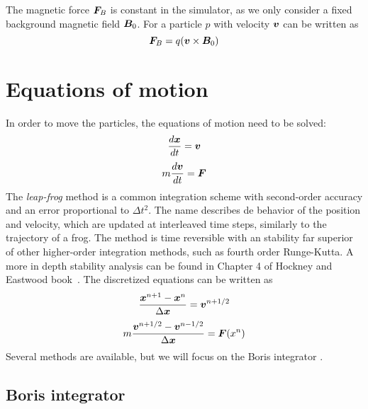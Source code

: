 The magnetic force $\bm{F}_B$ is constant in the simulator, as we only consider a 
fixed background magnetic field $\bm{B}_0$. For a particle $p$ with velocity $\bm{v}$  
can be written as
%
\begin{equation}%
\F_B = q (\v \times \B_0)
\end{equation}%


\section{Equations of motion}
\label{sec:motion}

In order to move the particles, the equations of motion need to be solved:
%
\begin{equation}
\frac{d\bm{x}}{dt}=\bm{v}
\end{equation}
\begin{equation}
m \frac{d\bm{v}}{dt} = \bm{F}
\end{equation}
%
The \textit{leap-frog} method is a common integration scheme with second-order 
accuracy and an error proportional to $\Delta t^2$. The name describes de 
behavior of the position and velocity, which are updated at interleaved time 
steps, similarly to the trajectory of a frog. The method is time reversible with 
an stability far superior of other higher-order integration methods, such as 
fourth order Runge-Kutta. A more in depth stability analysis can be found in 
Chapter 4 of Hockney and Eastwood book~\cite{hockney}.  The discretized 
equations can be written as
%
\begin{equation}
\frac{\bm{x}^{n+1} - \bm{x}^{n}}{\Delta \bm{x}} = \bm{v}^{n + 1/2}
\end{equation}
%
\begin{equation}
m\frac{\bm{v}^{n+1/2} - \bm{v}^{n-1/2}}{\Delta \bm{x}} = \bm{F}(x^n)
\end{equation}
%
Several methods are available, but we will focus on the Boris integrator 
\cite{boris}.

\subsection{Boris integrator}
\label{sec:boris}

